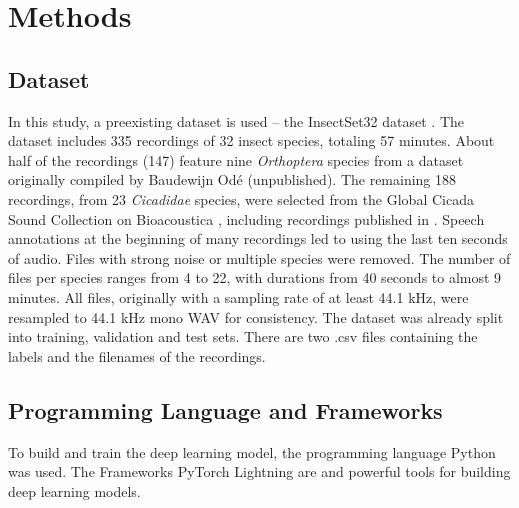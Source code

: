 

\section{Methods}
\label{methods}

\subsection{Dataset}%

In this study, a preexisting dataset is used -- the InsectSet32 dataset \autocite{faissInsectSet32DatasetAutomatic2022}. 
The dataset includes 335 recordings of 32 insect species, totaling 57 minutes.
About half of the recordings (147) feature nine \textit{Orthoptera} species from a dataset originally compiled by Baudewijn Odé (unpublished). 
The remaining 188 recordings, from 23 \textit{Cicadidae} species, were selected from the Global Cicada Sound 
Collection on Bioacoustica \autocite{bakerBioAcousticaFreeOpen2015}, including recordings 
published in \autocites{bakerGlobalCicadaSound2015}{poppleRevisionMyopsaltaCrucifera2017}. 
Speech annotations at the beginning of many recordings led to using the last ten seconds of audio. 
Files with strong noise or multiple species were removed. The number of files per species ranges from 4 to 22, 
with durations from 40 seconds to almost 9 minutes. All files, originally with a sampling rate of at least 44.1 kHz, 
were resampled to 44.1 kHz mono WAV for consistency.
The dataset was already split into training, validation and test sets. There are two .csv files containing
the labels and the filenames of the recordings.

\subsection{Programming Language and Frameworks}%
To build and train the deep learning model, the programming language Python was used.
The Frameworks PyTorch Lightning are  and powerful tools for building deep learning models.

